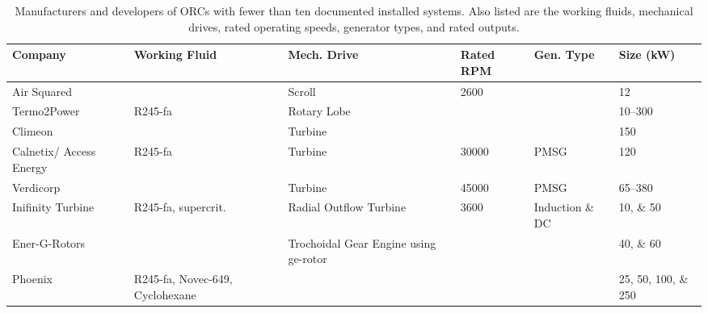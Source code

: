 \begin{table}
\centering
\caption{Manufacturers and developers of ORCs with fewer than ten documented installed systems. Also listed are the working fluids, mechanical drives, rated operating speeds, generator types, and rated outputs.}
\label{tab:orc_manufacturers_dev}

\begin{tabular}[c]{p{2.7cm}p{2.8cm}p{2.0cm}p{1.5cm}p{1.6cm}p{2.0cm}}%
	\toprule
	\textbf{Company}		& \textbf{Working Fluid}		& \textbf{Mech. Drive} 		& \textbf{Rated RPM}	& \textbf{Gen. Type}	& \textbf{Size (kW)}  \\
	\midrule
	Air Squared				& 									& Scroll					& 2600 			& 						& 12 \\ 
	Termo2Power				& R245-fa							& Rotary Lobe				& 				& 						& \numrange{10}{300} \\ 
	Climeon					& 									& Turbine					& 				& 						& 150 \\ 
	Calnetix/ Access Energy	& R245-fa							& Turbine					& 30000			& PMSG					& 120 \\ 
	Verdicorp				&									& Turbine					& 45000			& PMSG 					& \numrange{65}{380} \\ 
	Inifinity Turbine		& R245-fa, supercrit. \ch{CO2}		& Radial Outflow Turbine	& 3600			& Induction \& DC 		& \numlist{10;50} \\ 
	Ener-G-Rotors			& 									& Trochoidal Gear Engine using ge-rotor &	&  						& \numlist{40;60} \\ 
	Phoenix					& R245-fa, Novec-649, Cyclohexane	& 							& 				& 						& \numlist{25;50;100;250} \\ \bottomrule
\end{tabular}
\end{table}
	
